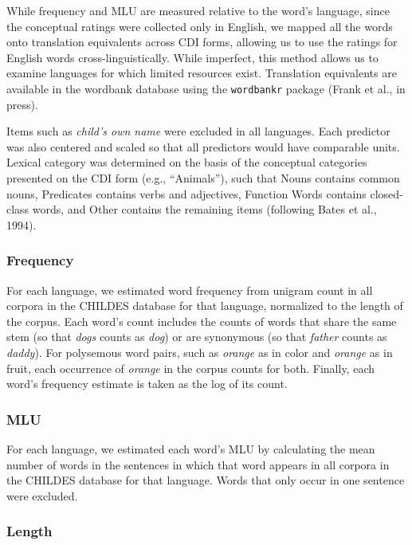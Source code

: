 \documentclass[10pt, letterpaper]{article}
\begin{document}
While frequency and MLU are measured relative to the word's language,
since the conceptual ratings were collected only in English, we mapped
all the words onto translation equivalents across CDI forms, allowing us
to use the ratings for English words cross-linguistically. While
imperfect, this method allows us to examine languages for which limited
resources exist. Translation equivalents are available in the wordbank
database using the \texttt{wordbankr} package (Frank et al., in press).

Items such as \emph{child's own name} were excluded in all languages.
Each predictor was also centered and scaled so that all predictors would
have comparable units. Lexical category was determined on the basis of
the conceptual categories presented on the CDI form (e.g., ``Animals''),
such that Nouns contains common nouns, Predicates contains verbs and
adjectives, Function Words contains closed-class words, and Other
contains the remaining items (following Bates et al., 1994).

\subsubsection{Frequency}\label{frequency}

For each language, we estimated word frequency from unigram count in all
corpora in the CHILDES database for that language, normalized to the
length of the corpus. Each word's count includes the counts of words
that share the same stem (so that \emph{dogs} counts as \emph{dog}) or
are synonymous (so that \emph{father} counts as \emph{daddy}). For
polysemous word pairs, such as \emph{orange} as in color and
\emph{orange} as in fruit, each occurrence of \emph{orange} in the
corpus counts for both. Finally, each word's frequency estimate is taken
as the log of its count.

\subsubsection{MLU}\label{mlu}

For each language, we estimated each word's MLU by calculating the mean
number of words in the sentences in which that word appears in all
corpora in the CHILDES database for that language. Words that only occur
in one sentence were excluded.

\subsubsection{Length}\label{length}
\end{document}
